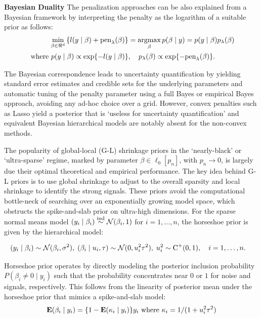 \documentclass[10pt]{article}
\begin{document}
\noindent \textbf{Bayesian Duality} The penalization approaches can be also explained from a Bayesian framework by interpreting the penalty as the logarithm of a suitable prior as follows:
\begin{align}
 \min_{\beta \in \Re^d}
  \left\{
    l(y \mid \beta) + \text{pen}_{\lambda}(\beta) 
  \right\}
  & = \argmax_\beta p(\beta \mid y) = p(y \mid \beta) p_{\lambda}(\beta) \nonumber \\
	\text{ where } p(y \mid \beta) \propto \exp\{-l(y \mid \beta)\} & , \quad p_{\lambda}(\beta)
  \propto \exp\{ -\text{pen}_{\lambda}(\beta) \}. \label{eq:pen} \nonumber
\end{align}

The Bayesian correspondence leads to uncertainty quantification by yielding standard error estimates and credible sets for the underlying parameters and automatic tuning of the penalty parameter using a full Bayes or empirical Bayes approach, avoiding any ad-hoc choice over a grid. However, convex penalties such as Lasso yield a posterior that is `useless for uncertainty quantification' \citep{castillo2015bayesian} and equivalent Bayesian hierarchical models are notably absent for the non-convex methods. 

The popularity of global-local (G-L) shrinkage priors in the `nearly-black' or `ultra-sparse' regime, marked by parameter $\beta \in \ell_0[p_n]$, with $p_n \to 0$, is largely due their optimal theoretical and empirical performance. The key idea behind G-L priors is to use global shrinkage to adjust to the overall sparsity and local shrinkage to identify the strong signals. These priors avoid the computational bottle-neck of searching over an exponentially growing model space, which obstructs the spike-and-slab prior \citep{mitchell88} on ultra-high dimensions. For the sparse normal means model $(y_i \mid \beta_i)  \stackrel{\mathrm{ind}}{\sim} \mathcal{N} (\beta_i,1)$ for $i = 1, \ldots, n$, the horseshoe prior \citep{carvalho2010horseshoe} is given by the hierarchical model: 

\begin{align*}
  (y_i \mid \beta_i) & \sim \mathcal{N}(\beta_i , \sigma^2), \;  (\beta_i \mid u_i, \tau) \sim 
  \mathcal{N}(0, u_i^2 \tau^2), \; u_i ^2 \sim \operatorname{C}^{+}(0,1), \quad i = 1, \ldots, n. 
\end{align*}

Horseshoe prior operates by directly modeling the posterior inclusion probability $P(\beta_i \ne 0 \mid y_i)$ such that the probability concentrates near $0$ or $1$ for noise and signals, respectively. This follows from the linearity of posterior mean under the horseshoe prior that mimics a spike-and-slab model:
\begin{equation}
{\bf E}(\beta_i \mid y_i) = \{1- {\bf E}(\kappa_i \mid y_i)\}y_i \text{ where } \kappa_i = 1/(1+u_i^2 \tau^2) \label{eq:kappa}
\end{equation}
\end{document}
